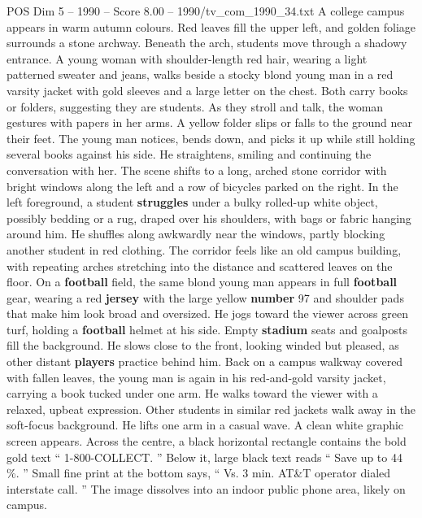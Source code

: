 \begin{textsample}{POS Dim 5 – 1990 – Score 8.00 – 1990/tv\_com\_1990\_34.txt}  \label{ex:f5_pos_019}
A college campus appears in warm autumn colours.
Red leaves fill the upper left, and golden foliage surrounds a stone archway.
Beneath the arch, students move through a shadowy entrance.
A young woman with shoulder-length red hair, wearing a light patterned sweater and jeans, walks beside a stocky blond young man in a red varsity jacket with gold sleeves and a large letter on the chest.
Both carry books or folders, suggesting they are students.
As they stroll and talk, the woman gestures with papers in her arms.
A yellow folder slips or falls to the ground near their feet.
The young man notices, bends down, and picks it up while still holding several books against his side.
He straightens, smiling and continuing the conversation with her.
The scene shifts to a long, arched stone corridor with bright windows along the left and a row of bicycles parked on the right.
In the left foreground, a student \textbf{struggles} under a bulky rolled-up white object, possibly bedding or a rug, draped over his shoulders, with bags or fabric hanging around him.
He shuffles along awkwardly near the windows, partly blocking another student in red clothing.
The corridor feels like an old campus building, with repeating arches stretching into the distance and scattered leaves on the floor.
On a \textbf{football} field, the same blond young man appears in full \textbf{football} gear, wearing a red \textbf{jersey} with the large yellow \textbf{number} 97 and shoulder pads that make him look broad and oversized.
He jogs toward the viewer across green turf, holding a \textbf{football} helmet at his side.
Empty \textbf{stadium} seats and goalposts fill the background.
He slows close to the front, looking winded but pleased, as other distant \textbf{players} practice behind him.
Back on a campus walkway covered with fallen leaves, the young man is again in his red-and-gold varsity jacket, carrying a book tucked under one arm.
He walks toward the viewer with a relaxed, upbeat expression.
Other students in similar red jackets walk away in the soft-focus background.
He lifts one arm in a casual wave.
A clean white graphic screen appears.
Across the centre, a black horizontal rectangle contains the bold gold text “ 1-800-COLLECT. ” Below it, large black text reads “ Save up to 44 \%. ” Small fine print at the bottom says, “ Vs. 3 min.
AT\&T operator dialed interstate call. ” The image dissolves into an indoor public phone area, likely on campus.

\end{textsample}
